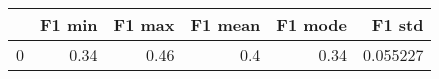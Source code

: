 \begin{tabular}{lrrrrr}
\toprule
{} &  F1 min &  F1 max &  F1 mean &  F1 mode &    F1 std \\
\midrule
0 &    0.34 &    0.46 &      0.4 &     0.34 &  0.055227 \\
\bottomrule
\end{tabular}
